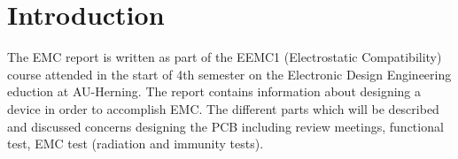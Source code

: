 \chapter{Introduction}
The EMC report is written as part of the EEMC1 (Electrostatic Compatibility) course attended in the start of 4th semester on the Electronic Design Engineering eduction at AU-Herning. The report contains information about designing a device in order to accomplish EMC. The different parts which will be described and discussed concerns designing the PCB including review meetings, functional test, EMC test (radiation and immunity tests).

\newpage
